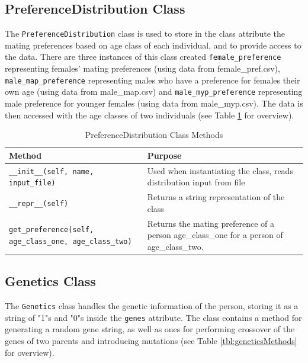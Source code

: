 \documentclass[authoryearcitations]{UoYCSproject}
\begin{document}
\newpage
\subsection{PreferenceDistribution Class}
The \texttt{PreferenceDistribution} class is used to store in the class attribute \texttt{} the mating preferences based on age class of each individual, and to provide access to the data. There are three instances of this class created \texttt{female\_preference} representing females' mating preferences (using data from female\_pref.csv), \texttt{male\_map\_preference} representing males who have a preference for females their own age (using data from male\_map.csv) and \texttt{male\_myp\_preference} representing male preference for younger females (using data from male\_myp.csv). The data is then accessed with the age classes of two individuals (see Table \ref{tbl:preferenceDistributionMethods} for overview).

\begin{table}[h]
\caption{PreferenceDistribution Class Methods}
\label{tbl:preferenceDistributionMethods}
\begin{tabular}{m{} m{}}
\textbf{Method} & \textbf{Purpose} \\\hline
\texttt{\_\_init\_\_(self, name, input\_file)} & Used when instantiating the class, reads distribution input from file\\\hline
\texttt{\_\_repr\_\_(self)} & Returns a string representation of the class \\\hline
\texttt{get\_preference(self, age\_class\_one, age\_class\_two)} & Returns the mating preference of a person age\_class\_one for a person of age\_class\_two.
\end{tabular}
\end{table}

\newpage
\subsection{Genetics Class}
The \texttt{Genetics} class handles the genetic information of the person, storing it as a string of "1"s and "0"s inside the \texttt{genes} attribute. The class contains a method for generating a random gene string, as well as ones for performing crossover of the genes of two parents and introducing mutations (see Table \ref{tbl:geneticsMethods} for overview).
\end{document}
